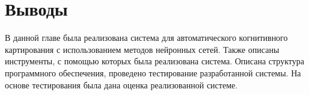 











\section{Выводы}

В данной главе была реализована система для автоматического когнитивного картирования с использованием
методов нейронных сетей.
Также описаны инструменты, с помощью которых была реализована система.
Описана структура программного обеспечения, проведено тестирование разработанной системы.
На основе тестирования была дана оценка реализованной системе.

